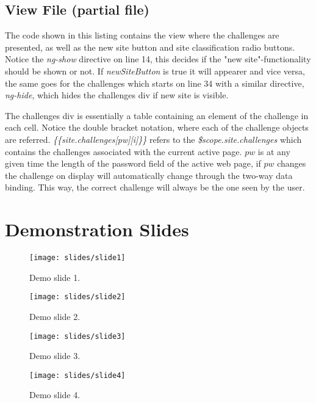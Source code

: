 \section{View File (partial file)}\label{app:view}

The code shown in this listing contains the view where the challenges are presented, as well as the new site button and site classification radio buttons. Notice the \emph{ng-show} directive on line 14, this decides if the "new site"-functionality should be shown or not. If \emph{newSiteButton} is true it will appearer and vice versa, the same goes for the challenges which starts on line 34 with a similar directive, \emph{ng-hide}, which hides the challenges div if new site is visible.  
\par The challenges div is essentially a table containing an element of the challenge in each cell. Notice the double bracket notation, where each of the challenge objects are referred. \emph{\{\{site.challenges[pw][i]\}\}} refers to the \emph{\$scope.site.challenges} which contains the challenges associated with the current active page. $pw$ is at any given time the length of the password field of the active web page, if $pw$ changes the challenge on display will automatically change through the two-way data binding. This way, the correct challenge will always be the one seen by the user.


\chapter{Demonstration Slides}\label{demo-slides}

\begin{figure}
    \texttt{[image: slides/slide1]}
    \caption{Demo slide 1.}
    \label{slide1}
\end{figure}


\begin{figure}
    \texttt{[image: slides/slide2]}
    \caption{Demo slide 2.}
    \label{slide2}
\end{figure}


\begin{figure}
    \texttt{[image: slides/slide3]}
    \caption{Demo slide 3.}
    \label{slide3}
\end{figure}


\begin{figure}
    \texttt{[image: slides/slide4]}
    \caption{Demo slide 4.}
    \label{slide4}
\end{figure}

